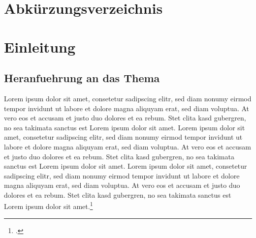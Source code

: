 \documentclass[11pt, a4paper]{article}
\begin{document}
    

    

    \tableofcontents
    \thispagestyle{empty}
    \setcounter{page}{1}
    \cleardoublepage

    \section*{Abkürzungsverzeichnis}
    \thispagestyle{fancy}
    \cleardoublepage

    \listoffigures
    \thispagestyle{fancy}
    \cleardoublepage

    \listoftables
    \thispagestyle{fancy}
    \cleardoublepage

    \setcounter{page}{1}
    \section{Einleitung}
    \subsection{Heranfuehrung an das Thema}
    Lorem ipsum dolor sit amet, consetetur sadipscing elitr, sed diam nonumy eirmod tempor invidunt ut labore et dolore magna aliquyam erat, sed diam voluptua. At vero eos et accusam et justo duo dolores et ea rebum. Stet clita kasd gubergren, no sea takimata sanctus est Lorem ipsum dolor sit amet. Lorem ipsum dolor sit amet, consetetur sadipscing elitr, sed diam nonumy eirmod tempor invidunt ut labore et dolore magna aliquyam erat, sed diam voluptua. At vero eos et accusam et justo duo dolores et ea rebum. Stet clita kasd gubergren, no sea takimata sanctus est Lorem ipsum dolor sit amet. Lorem ipsum dolor sit amet, consetetur sadipscing elitr, sed diam nonumy eirmod tempor invidunt ut labore et dolore magna aliquyam erat, sed diam voluptua. At vero eos et accusam et justo duo dolores et ea rebum. Stet clita kasd gubergren, no sea takimata sanctus est Lorem ipsum dolor sit amet.\footcite[vgl.][S. 21]{mustermann1} 
\end{document}
